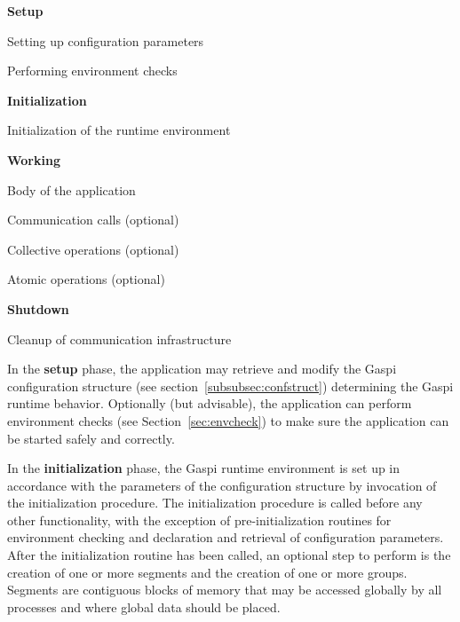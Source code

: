 \documentclass[a4paper]{article}
\newlength{\st}\setlength{\st}{0pt}
\newcommand{\GASPI}{{\sc Gaspi}}
\begin{document}
\begin{itemize}
\item \textbf{Setup}
  \begin{description}
  \item Setting up configuration parameters
  \item Performing environment checks
  \end{description}
\item \textbf{Initialization}
  \begin{description}
  \item Initialization of the runtime environment
  \end{description}
\item \textbf{Working}
  \begin{description}
  \item Body of the application
  \begin{description}
    \item Communication calls (optional)
    \item Collective operations (optional)
    \item Atomic operations (optional)
  \end{description}
  \end{description}
\item \textbf{Shutdown}
  \begin{description}
  \item Cleanup of communication infrastructure
  \end{description}
\end{itemize}


In the \textbf{setup} phase, the application may retrieve and modify
the \GASPI{} configuration structure (see section~\ref{subsubsec:confstruct})
determining the \GASPI{} runtime behavior. Optionally (but
advisable), the application can perform environment checks (see
Section~\ref{sec:envcheck}) to make sure the application can be
started safely and correctly.

In the \textbf{initialization} phase, the \GASPI{} runtime environment
is set up in accordance with the parameters of the configuration structure
by invocation of the initialization procedure.
The initialization procedure is called before any other functionality, with the
exception of pre-initialization routines for environment checking and
declaration and retrieval of configuration parameters.  After the
initialization routine has been called, an
optional step to perform is the creation of one or more segments and the creation of
one or more groups.
Segments are contiguous blocks of memory that may be accessed
globally by all processes and where global data should be placed.
\end{document}

